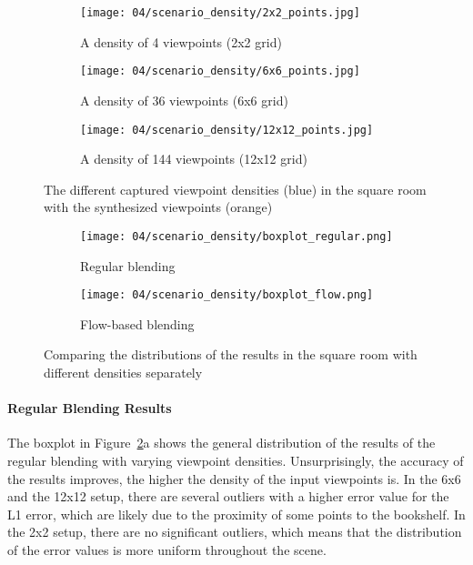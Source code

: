\begin{figure}
\centering
    \hfill
    \begin{subfigure}[t]{0.3\textwidth}
            \centering
            \texttt{[image: 04/scenario\_density/2x2\_points.jpg]}
            \caption{A density of 4 viewpoints (2x2 grid)}
    \end{subfigure}
    \hfill
    \begin{subfigure}[t]{0.3\textwidth}
            \centering
            \texttt{[image: 04/scenario\_density/6x6\_points.jpg]}
            \caption{A density of 36 viewpoints (6x6 grid)}
    \end{subfigure}
    \hfill
    \begin{subfigure}[t]{0.3\textwidth}
            \centering
            \texttt{[image: 04/scenario\_density/12x12\_points.jpg]}
            \caption{A density of 144 viewpoints (12x12 grid)}
    \end{subfigure}
    \hfill
  \caption[The different captured viewpoint densities in the square room]{The different captured viewpoint densities (blue) in the square room with the synthesized viewpoints (orange)} \label{fig:density_setup}
\end{figure}

\begin{figure}
\centering
    \hfill
    \begin{subfigure}[b]{0.5\textwidth}
            \centering
            \texttt{[image: 04/scenario\_density/boxplot\_regular.png]}
            \caption{Regular blending}
    \end{subfigure}%
    \hfill
    \begin{subfigure}[b]{0.5\textwidth}
            \centering
            \texttt{[image: 04/scenario\_density/boxplot\_flow.png]}
            \caption{Flow-based blending}
    \end{subfigure}
    \hfill
  \caption[Comparing the distributions of the results with different densities separately]{Comparing the distributions of the results in the square room with different densities separately}
  \label{fig:density_boxplot_split}
\end{figure}

\paragraph{Regular Blending Results}
The boxplot in Figure~\ref{fig:density_boxplot_split}a shows the general distribution of the results of the regular blending with varying viewpoint densities. Unsurprisingly, the accuracy of the results improves, the higher the density of the input viewpoints is.
In the 6x6 and the 12x12 setup, there are several outliers with a higher error value for the L1 error, which are likely due to the proximity of some points to the bookshelf. In the 2x2 setup, there are no significant outliers, which means that the distribution of the error values is more uniform throughout the scene.

